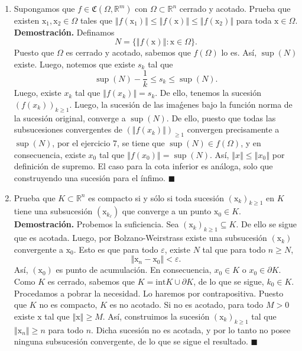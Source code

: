 \documentclass[12pt]{article}
\newcommand{\norm}[1]{\left\Vert#1\right\Vert}
\newcommand{\Co}{\mathfrak C}
\newcommand{\R}{\mathbb R}
\newcommand{\x}{\mathrm x}
\begin{document}
\begin{enumerate}
\item Supongamos que $f\in \Co(\Omega,\R^m)$ con $\Omega\subset \R^n$ cerrado y acotado. Prueba que existen $\x_1,\x_2\in \Omega$ tales que 
$\norm{f(\x_1)}\leq \norm{f(\x)}\leq \norm{f(\x_2)}$ para toda $\x\in \Omega$. \\
\textbf{Demostración.} Definamos
\[
N=\{\norm{f(\x)}:\x\in \Omega\}.
\]
Puesto que $\Omega$ es cerrado y acotado, sabemos que $f(\Omega)$ lo es. Así, $\sup(N)$ existe. Luego, notemos que existe $s_k$ tal que
\[
\sup(N)-\frac{1}{k} \leq s_k \leq \sup(N).
\]
Luego, existe $x_k$ tal que $\norm{f(x_k)}=s_k$. De ello, tenemos la sucesión $(f(x_k))_{k\geq 1}$. Luego, la sucesión de las imaǵenes bajo la función norma de la sucesión original, converge a $\sup(N)$. De ello, puesto que todas las subsucesiones convergentes de $(\norm{f(x_k)})_{\geq 1}$ convergen precisamente a $\sup(N)$, por el ejercicio 7, se tiene que
$\sup(N) \in f(\Omega)$, y en consecuencia, existe $x_0$ tal que $\norm{f(x_0)}=\sup(N)$. Así, $\norm{x}\leq \norm{x_0}$ por definición de supremo. El caso para la cota inferior es análoga, solo que construyendo una sucesión para el ínfimo. \hfill $\blacksquare$

\newpage
\item Prueba que $K\subset \R^n$ es compacto si y s\'olo si toda sucesión $(\x_k)_{k\geq 1}$ en $K$ tiene una subsucesi\'on $(\x_{k_\ell})$ que converge a un punto $\x_0\in K$. \\
\textbf{Demostración.} Probemos la suficiencia. Sea $(\x_k)_{k\geq 1}\subseteq K$. De ello se sigue que es acotada. Luego, por Bolzano-Weirstrass existe una subsucesión $(\x_k)$ convergente a $\x_0$. Esto es que para todo $\varepsilon$, existe $N$ tal que para todo $n\geq N$,
\[
    \norm{\x_n-\x_0}<\varepsilon.
\]
Así, $(\x_0)$ es punto de acumulación. En consecuencia, $x_0 \in K$ o $x_0 \in \partial K$. Como $K$ es cerrado, sabemos que $K=\text{int}K\cup \partial K$, de lo que se sigue, $k_0 \in K$. \\
Procedamos a pobrar la necesidad. Lo haremos por contrapositiva. Puesto que
$K$ no es compacto, $K$ es no acotado. Si no es acotado, para todo $M > 0$ existe $\x$ tal que $\norm{\x}\geq M$. Así, construimos la sucesión $(\x_k)_{k\geq 1}$ tal que $\norm{\x_n} \geq n$ para todo $n$. Dicha sucesión no es acotada, y por lo tanto no posee ninguna subsucesión convergente, de lo que se sigue el resultado. \hfill $\blacksquare$


\end{enumerate}
\end{document}
